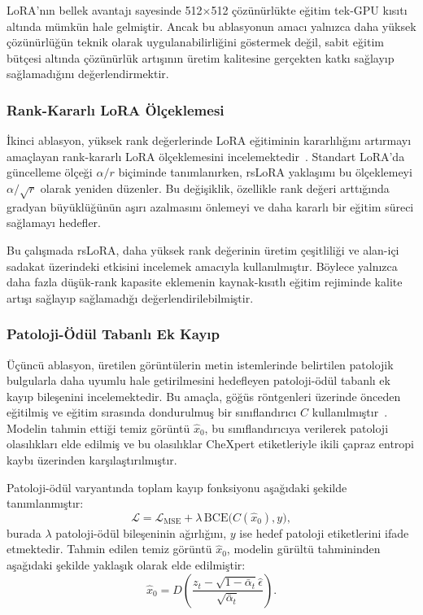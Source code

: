 \documentclass[11pt]{article}
\begin{document}
LoRA'nın bellek avantajı sayesinde 512$\times$512 çözünürlükte eğitim tek-GPU
kısıtı altında mümkün hale gelmiştir. Ancak bu ablasyonun amacı yalnızca daha
yüksek çözünürlüğün teknik olarak uygulanabilirliğini göstermek değil, sabit
eğitim bütçesi altında çözünürlük artışının üretim kalitesine gerçekten katkı
sağlayıp sağlamadığını değerlendirmektir.

\subsubsection{Rank-Kararlı LoRA Ölçeklemesi}

İkinci ablasyon, yüksek rank değerlerinde LoRA eğitiminin kararlılığını
artırmayı amaçlayan rank-kararlı LoRA ölçeklemesini incelemektedir~\cite{rslora}.
Standart LoRA'da güncelleme ölçeği $\alpha/r$ biçiminde tanımlanırken,
rsLoRA yaklaşımı bu ölçeklemeyi $\alpha/\sqrt{r}$ olarak yeniden düzenler.
Bu değişiklik, özellikle rank değeri arttığında gradyan büyüklüğünün aşırı
azalmasını önlemeyi ve daha kararlı bir eğitim süreci sağlamayı hedefler.

Bu çalışmada rsLoRA, daha yüksek rank değerinin üretim çeşitliliği ve alan-içi
sadakat üzerindeki etkisini incelemek amacıyla kullanılmıştır. Böylece yalnızca
daha fazla düşük-rank kapasite eklemenin kaynak-kısıtlı eğitim rejiminde kalite
artışı sağlayıp sağlamadığı değerlendirilebilmiştir.

\subsubsection{Patoloji-Ödül Tabanlı Ek Kayıp}

Üçüncü ablasyon, üretilen görüntülerin metin istemlerinde belirtilen patolojik
bulgularla daha uyumlu hale getirilmesini hedefleyen patoloji-ödül tabanlı ek
kayıp bileşenini incelemektedir. Bu amaçla, göğüs röntgenleri üzerinde
önceden eğitilmiş ve eğitim sırasında dondurulmuş bir sınıflandırıcı
$C$ kullanılmıştır~\cite{xrv}. Modelin tahmin ettiği temiz görüntü
$\hat{x}_0$, bu sınıflandırıcıya verilerek patoloji olasılıkları elde edilmiş
ve bu olasılıklar CheXpert etiketleriyle ikili çapraz entropi kaybı üzerinden
karşılaştırılmıştır.

Patoloji-ödül varyantında toplam kayıp fonksiyonu aşağıdaki şekilde
tanımlanmıştır:
\begin{equation}
\mathcal{L} =
\mathcal{L}_{\text{MSE}} +
\lambda \,
\text{BCE}\big(C(\hat{x}_0), y\big),
\label{eq:prg_loss}
\end{equation}
burada $\lambda$ patoloji-ödül bileşeninin ağırlığını, $y$ ise hedef patoloji
etiketlerini ifade etmektedir. Tahmin edilen temiz görüntü $\hat{x}_0$,
modelin gürültü tahmininden aşağıdaki şekilde yaklaşık olarak elde edilmiştir:
\begin{equation}
\hat{x}_0 =
D\left(
\frac{
z_t - \sqrt{1-\bar\alpha_t}\hat{\epsilon}
}{
\sqrt{\bar\alpha_t}
}
\right).
\label{eq:x0_prediction}
\end{equation}
\end{document}

